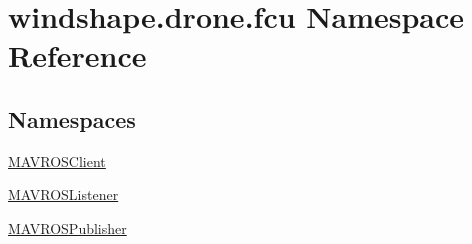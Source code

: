\hypertarget{namespacewindshape_1_1drone_1_1fcu}{}\section{windshape.\+drone.\+fcu Namespace Reference}
\label{namespacewindshape_1_1drone_1_1fcu}
\subsection*{Namespaces}
\begin{DoxyCompactItemize}
\item 
 \mbox{\hyperlink{namespacewindshape_1_1drone_1_1fcu_1_1_m_a_v_r_o_s_client}{M\+A\+V\+R\+O\+S\+Client}}
\item 
 \mbox{\hyperlink{namespacewindshape_1_1drone_1_1fcu_1_1_m_a_v_r_o_s_listener}{M\+A\+V\+R\+O\+S\+Listener}}
\item 
 \mbox{\hyperlink{namespacewindshape_1_1drone_1_1fcu_1_1_m_a_v_r_o_s_publisher}{M\+A\+V\+R\+O\+S\+Publisher}}
\end{DoxyCompactItemize}
